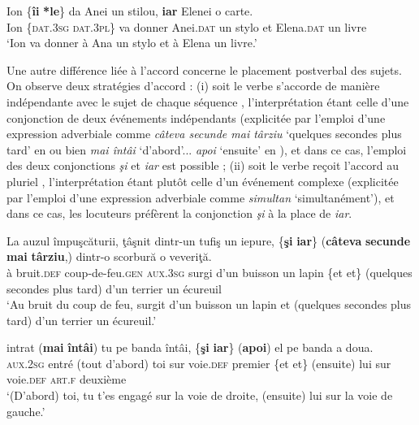 \ex 
\gll Ion \{\textbf{îi} {\textbar} \textbf{*le}\}    da  Anei  un  stilou,  \textbf{iar}  Elenei  o  carte. \label{ch2:ex306b}\\
Ion  \{\textsc{dat.3sg} {\textbar} \textsc{dat.3pl}\}  va  donner  Anei.\textsc{dat}  un  stylo  et  Elena.\textsc{dat}  un  livre\\
\glt ‘Ion va donner à Ana un stylo et à Elena un livre.’ 
\z
\z

Une autre différence liée à l’accord concerne le placement postverbal des sujets. On observe deux stratégies d’accord : (i) soit le verbe s’accorde de manière indépendante avec le sujet de chaque séquence , l’interprétation étant celle d’une conjonction de deux événements indépendants (explicitée par l’emploi d’une expression adverbiale comme \textit{câteva secunde mai târziu} ‘quelques secondes plus tard’ en  ou bien \textit{mai întâi} ‘d’abord’... \textit{apoi} ‘ensuite’ en ), et dans ce cas, l’emploi des deux conjonctions \textit{şi} et \textit{iar} est possible ; (ii) soit le verbe reçoit l’accord au pluriel , l’interprétation étant plutôt celle d’un événement complexe (explicitée par l’emploi d’une expression adverbiale comme \textit{simultan} ‘simultanément’), et dans ce cas, les locuteurs préfèrent la conjonction \textit{şi} à la place de \textit{iar}. 

\ea \label{ch2:ex307}
\ea 
\gll La  auzul  împuşcăturii,    ţâşnit  dintr-un  tufiş  un  iepure, \{\textbf{şi} {\textbar} \textbf{iar}\}  (\textbf{câteva} \textbf{secunde} \textbf{mai} \textbf{târziu},)  dintr-o  scorbură  o  veveriţă. \label{ch2:ex307a}\\
à  bruit.\textsc{def}  coup-de-feu.\textsc{gen} \textsc{aux.3sg} surgi  d’un  buisson  un  lapin \{et {\textbar} et\}  (quelques  secondes  plus  tard)  d’un  terrier  un  écureuil\\
\glt ‘Au bruit du coup de feu, surgit d’un buisson un lapin et (quelques secondes plus tard) d’un terrier un écureuil.’

\ex
\gll {} intrat  (\textbf{mai} \textbf{întâi}) tu  pe  banda  întâi,  \{\textbf{şi} {\textbar} \textbf{iar}\}  (\textbf{apoi}) el  pe  banda  a  doua. \label{ch2:ex307b}\\
\textsc{aux.2sg} entré  (tout d’abord)  toi  sur  voie.\textsc{def}  premier  \{et {\textbar} et\}  (ensuite) lui  sur  voie.\textsc{def}  \textsc{art.f}  deuxième\\
\glt ‘(D’abord) toi, tu t’es engagé sur la voie de droite, (ensuite) lui sur la voie de gauche.’ 
\z
\z


